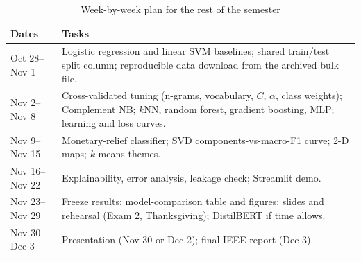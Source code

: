 \documentclass[conference]{IEEEtran}
\begin{document}
\begin{table}[!t]
\caption{Week-by-week plan for the rest of the semester}
\label{tab:plan}
\centering
\footnotesize
\begin{tabular}{@{}p{}p{}@{}}
\toprule
Dates & Tasks \\
\midrule
Oct 28--Nov 1 & Logistic regression and linear SVM baselines; shared train/test split column; reproducible data download from the archived bulk file. \\
Nov 2--Nov 8 & Cross-validated tuning (n-grams, vocabulary, $C$, $\alpha$, class weights); Complement NB; $k$NN, random forest, gradient boosting, MLP; learning and loss curves. \\
Nov 9--Nov 15 & Monetary-relief classifier; SVD components-vs-macro-F1 curve; 2-D maps; $k$-means themes. \\
Nov 16--Nov 22 & Explainability, error analysis, leakage check; Streamlit demo. \\
Nov 23--Nov 29 & Freeze results; model-comparison table and figures; slides and rehearsal (Exam 2, Thanksgiving); DistilBERT if time allows. \\
Nov 30--Dec 3 & Presentation (Nov 30 or Dec 2); final IEEE report (Dec 3). \\
\bottomrule
\end{tabular}
\end{table}
\end{document}
